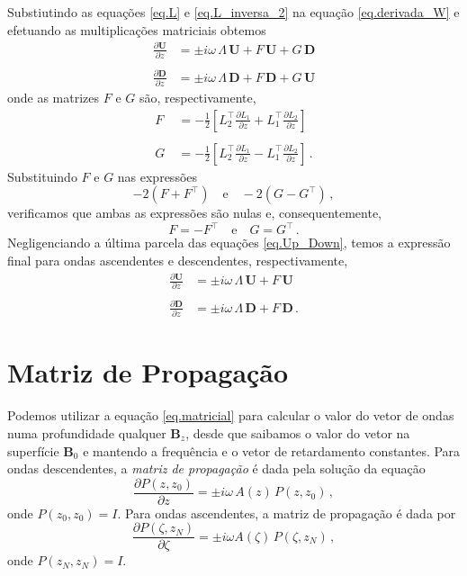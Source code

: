 Substiutindo as equa\c{c}\~oes \ref{eq.L} e \ref{eq.L_inversa_2} na equa\c{c}\~ao \ref{eq.derivada_W} e efetuando as multiplica\c{c}\~oes matriciais obtemos
\begin{align}\label{eq.Up_Down}\nonumber
\frac{\partial\mathbf{U}}{\partial z}&=\pm i\omega\,\Lambda\,\mathbf{U}+F\,\mathbf{U}+G\,\mathbf{D}\\\quad\\\nonumber
\frac{\partial\mathbf{D}}{\partial z}&=\pm i\omega\,\Lambda\,\mathbf{D}+F\,\mathbf{D}+G\,\mathbf{U}
\end{align}
onde as matrizes $F$ e $G$ s\~ao, respectivamente,
\begin{align*}
F&=-\frac{1}{2}\left[L_2^\top\frac{\partial L_1}{\partial z}+L_1^\top\frac{\partial L_2}{\partial z}\right]\\\quad\\
G&=-\frac{1}{2}\left[L_2^\top\frac{\partial L_1}{\partial z}-L_1^\top\frac{\partial L_2}{\partial z}\right]\,.
\end{align*}
Substituindo $F$ e $G$ nas express\~oes
\begin{equation*}
-2(F+F^\top)\quad\text{e}\quad-2(G-G^\top)\,,
\end{equation*}
verificamos que ambas as express\~oes s\~ao nulas e, consequentemente,
\begin{equation*}
F=-F^\top\quad\text{e}\quad G=G^\top\,.
\end{equation*}
Negligenciando a \'ultima parcela das equa\c{c}\~oes \ref{eq.Up_Down}, temos a express\~ao final para ondas ascendentes e descendentes, respectivamente,
\begin{align}\label{eq.Up_Down_2}\nonumber
\frac{\partial\mathbf{U}}{\partial z}&=\pm i\omega\,\Lambda\,\mathbf{U}+F\,\mathbf{U}\\\quad\\\nonumber
\frac{\partial\mathbf{D}}{\partial z}&=\pm i\omega\,\Lambda\,\mathbf{D}+F\,\mathbf{D}\,.
\end{align}

\section{Matriz de Propaga\c{c}\~ao}

Podemos utilizar a equa\c{c}\~ao \ref{eq.matricial} para calcular o valor do vetor de ondas numa profundidade qualquer $\mathbf{B}_z$, desde que saibamos o valor do vetor na superf\'icie $\mathbf{B}_0$ e mantendo a frequ\^encia e o vetor de retardamento constantes. Para ondas descendentes, a \textit{matriz de propaga\c{c}\~ao} \'e dada pela solu\c{c}\~ao da equa\c{c}\~ao 
\begin{equation}\label{eq.matriz_propagacao}
\frac{\partial P(z,z_0)}{\partial z}=\pm i\omega\,A(z)\,P(z,z_0)\,,
\end{equation}
onde $P(z_0,z_0)=I$. Para ondas ascendentes, a matriz de propaga\c{c}\~ao \'e dada por
\begin{equation*}
\frac{\partial P(\zeta,z_N)}{\partial \zeta}=\pm i\omega A(\zeta)\,P(\zeta,z_N)\,,
\end{equation*}
onde $P(z_N,z_N)=I$.

